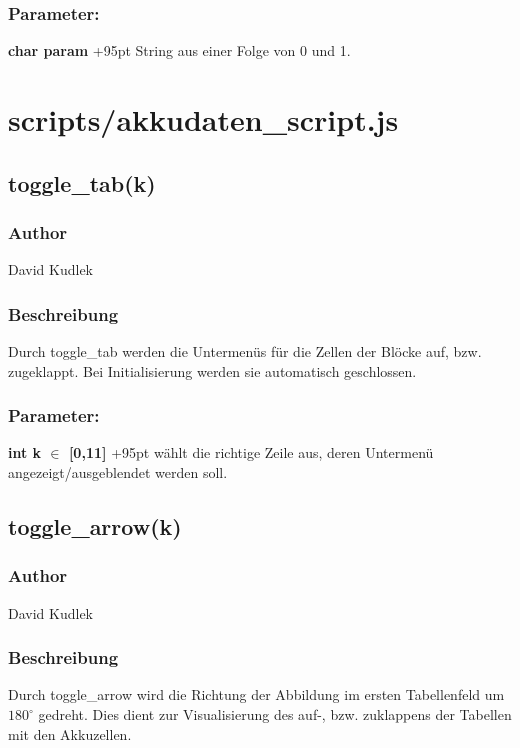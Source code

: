 \documentclass[fontsize = 12pt, paper = a4]{scrreprt}
\begin{document}
\subsubsection*{Parameter:}
\textbf{char param } 
\hspace{8mm}
\hangindent+95pt 
String aus einer Folge von 0 und 1.\\


\section{scripts/akkudaten\_script.js}


\subsection*{toggle\_tab(k)}
\subsubsection*{Author}
David Kudlek
\subsubsection*{Beschreibung}
Durch toggle\_tab werden die Untermenüs für die Zellen der Blöcke auf, bzw. zugeklappt. Bei Initialisierung werden sie automatisch geschlossen.	
\subsubsection*{Parameter:}
\textbf{int k $\in$ [0,11]} 
\hspace{3,5mm}
\hangindent+95pt 
wählt die richtige Zeile aus, deren Untermenü angezeigt/ausgeblendet werden soll.\\


\subsection*{toggle\_arrow(k)}
\subsubsection*{Author}
David Kudlek
\subsubsection*{Beschreibung}
Durch toggle\_arrow wird die Richtung der Abbildung im ersten Tabellenfeld um $180^\circ$ gedreht. Dies dient zur Visualisierung des auf-, bzw. zuklappens der Tabellen mit den Akkuzellen.	
\end{document}
